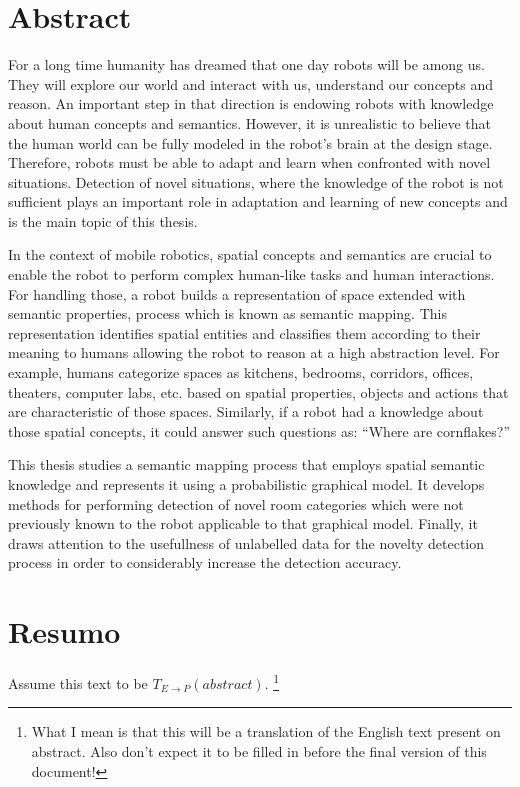 \chapter*{Abstract}

For a long time humanity has dreamed that one day robots will be among us. They will explore our world
and interact with us, understand our concepts and reason. An important step in that direction is endowing 
robots with knowledge about human concepts and semantics. However, it is unrealistic to believe that the 
human world can be fully modeled in the robot's brain at the design stage. Therefore, robots must be able 
to adapt and learn when confronted with novel situations. Detection of novel situations, where the knowledge
of the robot is not sufficient plays an important role in adaptation and learning of new concepts and 
is the main topic of this thesis.

In the context of mobile robotics, spatial concepts and semantics are crucial to enable the robot to perform
complex human-like tasks and human interactions. For handling those, a robot builds a representation
of space extended with semantic properties, process which is known as semantic mapping.
This representation identifies spatial entities and classifies them according to their meaning to
humans allowing the robot to reason at a high abstraction level. For example, humans categorize spaces as 
kitchens, bedrooms, corridors, offices, theaters, computer labs, etc. based on spatial properties, 
objects and actions that are characteristic of those spaces. Similarly, if a robot had a knowledge about
those spatial concepts, it could answer such questions as: ``Where are cornflakes?''

This thesis studies a semantic mapping process that employs spatial semantic knowledge
and represents it using a probabilistic graphical model. It develops methods 
for performing detection of novel room categories which were not previously known to the robot applicable 
to that graphical model. Finally, it draws attention to the usefullness of unlabelled data for the 
novelty detection process in order to considerably increase the detection accuracy.

\chapter*{Resumo}
Assume this text to be $T_{E \rightarrow P}(abstract)$.
\footnote{What I mean is that this will be a translation of the English text
present on abstract. Also don't expect it to be filled in before the final
version of this document!}

